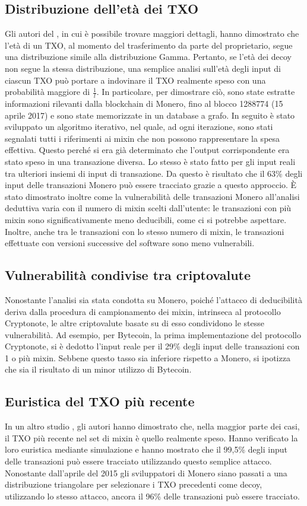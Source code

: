 \subsection{Distribuzione dell'età dei TXO}
Gli autori del \cite{art:4}, in cui è possibile trovare maggiori dettagli, hanno dimostrato che l'età di un TXO, al momento del trasferimento da parte del proprietario, segue una distribuzione simile alla distribuzione Gamma. Pertanto, se l'età dei decoy non segue la stessa distribuzione, una semplice analisi sull'età degli input di ciascun TXO può portare a indovinare il TXO realmente speso con una probabilità maggiore di $\frac{1}{l}$. In particolare, per dimostrare ciò, sono state estratte informazioni rilevanti dalla blockchain di Monero, fino al blocco 1288774 (15 aprile 2017) e sono state memorizzate in un database a grafo. In seguito è stato sviluppato un algoritmo iterativo, nel quale, ad ogni iterazione, sono stati segnalati tutti i riferimenti ai mixin che non possono rappresentare la spesa effettiva. Questo perché si era già determinato che l'output corrispondente era stato speso in una transazione diversa. Lo stesso è stato fatto per gli input reali tra ulteriori insiemi di input di transazione. Da questo è risultato che il 63\% degli input delle transazioni Monero può essere tracciato grazie a questo approccio. È stato dimostrato inoltre come la vulnerabilità delle transazioni Monero all'analisi deduttiva varia con il numero di mixin scelti dall'utente: le transazioni con più mixin sono significativamente meno deducibili, come ci si potrebbe aspettare. Inoltre, anche tra le transazioni con lo stesso numero di mixin, le transazioni effettuate con versioni successive del software sono meno vulnerabili.

\subsection{Vulnerabilità condivise tra criptovalute}
Nonostante l'analisi sia stata condotta su Monero, poiché l'attacco di deducibilità deriva dalla procedura di campionamento dei mixin, intrinseca al protocollo Cryptonote, le altre criptovalute basate su di esso condividono le stesse vulnerabilità. Ad esempio, per Bytecoin, la prima implementazione del protocollo Cryptonote, si è dedotto l'input reale per il 29\% degli input delle transazioni con 1 o più mixin. Sebbene questo tasso sia inferiore rispetto a Monero, si ipotizza che sia il risultato di un minor utilizzo di Bytecoin.

\subsection{Euristica del TXO più recente}
In un altro studio \cite{art:2}, gli autori hanno dimostrato che, nella maggior parte dei casi, il TXO più recente nel set di mixin è quello realmente speso. Hanno verificato la loro euristica mediante simulazione e hanno mostrato che il 99,5\% degli input delle transazioni può essere tracciato utilizzando questo semplice attacco. Nonostante dall'aprile del 2015 gli sviluppatori di Monero siano passati a una distribuzione triangolare per selezionare i TXO precedenti come decoy, utilizzando lo stesso attacco, ancora il 96\% delle transazioni può essere tracciato.

